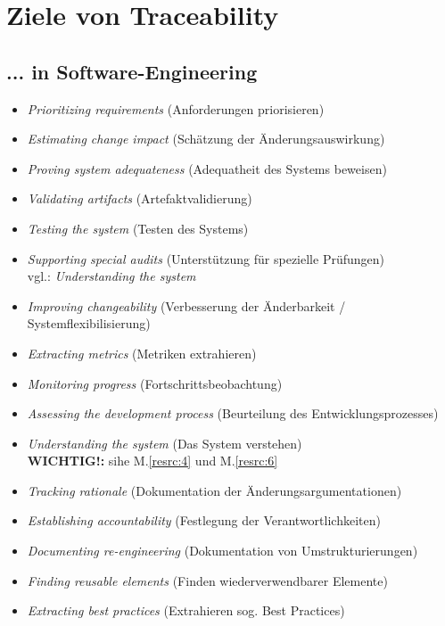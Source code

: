 \section{Ziele von Traceability}
\subsection{... in Software-Engineering}
\begin{itemize}

\item 
\textit{Prioritizing requirements}
(Anforderungen priorisieren)
\item 
\textit{Estimating change impact}
(Schätzung der Änderungsauswirkung)
\item 
\textit{Proving system adequateness}
(Adequatheit des Systems beweisen)
\item 
\textit{Validating artifacts}
(Artefaktvalidierung)
\item 
\textit{Testing the system}
(Testen des Systems)
\item 
\textit{Supporting special audits}
(Unterstützung für spezielle Prüfungen)
\\vgl.: \textit{Understanding the system}
\item 
\textit{Improving changeability}
(Verbesserung der Änderbarkeit / Systemflexibilisierung)
\item 
\textit{Extracting metrics}
(Metriken extrahieren)
\item 
\textit{Monitoring progress}
(Fortschrittsbeobachtung)
\item 
\textit{Assessing the development process}
(Beurteilung des Entwicklungsprozesses)
\item 
\textit{Understanding the system}
(Das System verstehen)
\\\textbf{WICHTIG!:} sihe M.\ref{resrc:4} und M.\ref{resrc:6}
\item 
\textit{Tracking rationale}
(Dokumentation der Änderungsargumentationen)
\item 
\textit{Establishing accountability}
(Festlegung der Verantwortlichkeiten)
\item 
\textit{Documenting re-engineering}
(Dokumentation von Umstrukturierungen)
\item 
\textit{Finding reusable elements}
(Finden wiederverwendbarer Elemente)
\item 
\textit{Extracting best practices}
(Extrahieren sog. Best Practices)

\end{itemize}
